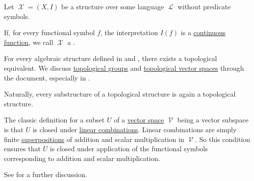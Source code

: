 \begin{remark}\label{rem:topological_first_order_structures}
  Let \( \mscrX = (X, I) \) be a structure over some language \( \mscrL \) without predicate symbols.

  If, for every functional symbol \( f \), the interpretation \( I(f) \) is a \hyperref[def:global_continuity]{continuous function}, we call \( \mscrX \) a .

  For every algebraic structure defined in  and , there exists a topological equivalent. We discuss \hyperref[def:topological_group]{topological groups} and \hyperref[def:topological_vector_space]{topological vector spaces} through the document, especially in .

  Naturally, every substructure of a topological structure is again a topological structure.
\end{remark}

\begin{example}\label{ex:def:first_order_substructure/vector_space}
  The classic definition for a subset \( U \) of a \hyperref[def:vector_space]{vector space} \( \mscrV \) being a vector subspace is that \( U \) is closed under \hyperref[rem:linear_combinations]{linear combinations}. Linear combinations are simply finite \hyperref[def:multi_valued_function/superposition]{superpositions} of addition and scalar multiplication in \( \mscrV \). So this condition ensures that \( U \) is closed under application of the functional symbols corresponding to addition and scalar multiplication.

  See  for a further discussion.
\end{example}

